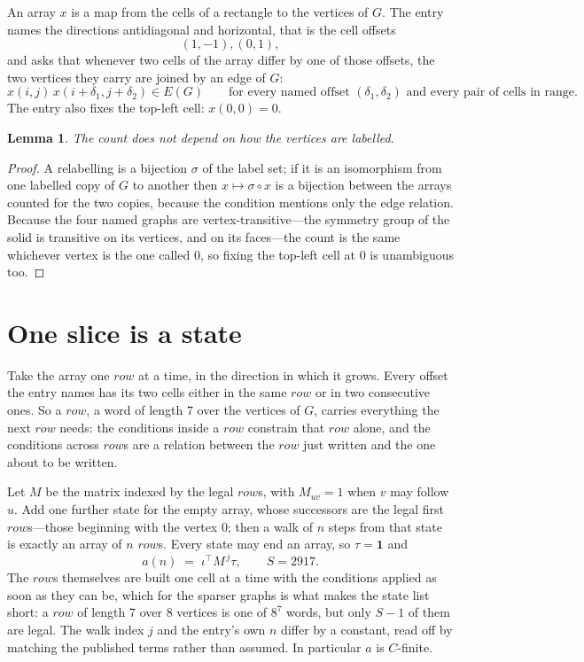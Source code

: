 \documentclass[11pt,a4paper]{article}
\theoremstyle{plain}
\newtheorem{lemma}[theorem]{Lemma}
\theoremstyle{definition}
\begin{document}
An array $x$ is a map from the cells of a rectangle to the vertices of $G$. The entry names the
directions antidiagonal and horizontal, that is the cell offsets
\[
(1,-1), (0,1),
\]
and asks that whenever two cells of the array differ by one of those offsets, the two vertices
they carry are joined by an edge of $G$:
\[
x(i,j)\,x(i+\delta_1,j+\delta_2)\in E(G)\qquad
\text{for every named offset } (\delta_1,\delta_2)\text{ and every pair of cells in range.}
\]
The entry also fixes the top-left cell: $x(0,0)=0$.

\begin{lemma}\label{lem:label}
The count does not depend on how the vertices are labelled.
\end{lemma}

\begin{proof}
A relabelling is a bijection $\sigma$ of the label set; if it is an isomorphism from one
labelled copy of $G$ to another then $x\mapsto\sigma\circ x$ is a bijection between the arrays
counted for the two copies, because the condition mentions only the edge relation.
Because the four named graphs are vertex-transitive---the symmetry group of the solid is transitive on its vertices, and on its faces---the count is the same whichever vertex is the one called $0$, so fixing the top-left cell at $0$ is unambiguous too.
\end{proof}

\section{One slice is a state}

Take the array one $row$ at a time, in the direction in which it grows.
Every offset the entry names has its two cells either in the same $row$ or in two
consecutive ones. So a $row$, a word of length $7$ over the vertices of $G$, carries
everything the next $row$ needs: the conditions inside a $row$ constrain that
$row$ alone, and the conditions across $row$s are a relation between the
$row$ just written and the one about to be written.

Let $M$ be the matrix indexed by the legal $row$s, with $M_{uv}=1$ when $v$ may
follow $u$. Add one further state for the empty array, whose successors are the legal first
$row$s---those beginning with the vertex $0$; then a walk of
$n$ steps from that state is exactly an array of $n$ $row$s. Every state may end an
array, so $\tau=\mathbf{1}$ and
\[
a(n)\;=\;\iota^{\!\top}M^{\,j}\tau ,\qquad S=2917.
\]
The $row$s themselves are built one cell at a time with the conditions applied as soon
as they can be, which for the sparser graphs is what makes the state list short: a $row$
of length $7$ over $8$ vertices is one of $8^{7}$ words, but only $S-1$ of them are
legal. The walk index $j$ and the entry's own $n$ differ by a constant, read off by matching the
published terms rather than assumed. In particular $a$ is $C$-finite.
\end{document}
